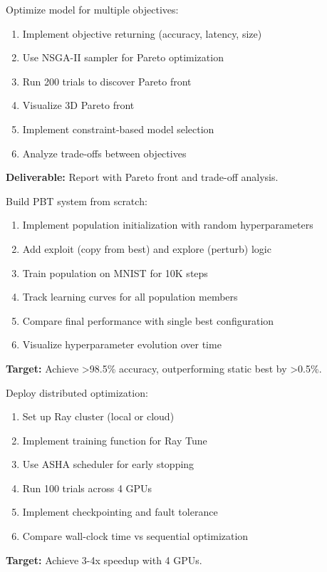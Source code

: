 \begin{exercise}
Optimize model for multiple objectives:
\begin{enumerate}
    \item Implement objective returning (accuracy, latency, size)
    \item Use NSGA-II sampler for Pareto optimization
    \item Run 200 trials to discover Pareto front
    \item Visualize 3D Pareto front
    \item Implement constraint-based model selection
    \item Analyze trade-offs between objectives
\end{enumerate}
\textbf{Deliverable:} Report with Pareto front and trade-off analysis.
\end{exercise}

\begin{exercise}
Build PBT system from scratch:
\begin{enumerate}
    \item Implement population initialization with random hyperparameters
    \item Add exploit (copy from best) and explore (perturb) logic
    \item Train population on MNIST for 10K steps
    \item Track learning curves for all population members
    \item Compare final performance with single best configuration
    \item Visualize hyperparameter evolution over time
\end{enumerate}
\textbf{Target:} Achieve >98.5\% accuracy, outperforming static best by >0.5\%.
\end{exercise}

\begin{exercise}
Deploy distributed optimization:
\begin{enumerate}
    \item Set up Ray cluster (local or cloud)
    \item Implement training function for Ray Tune
    \item Use ASHA scheduler for early stopping
    \item Run 100 trials across 4 GPUs
    \item Implement checkpointing and fault tolerance
    \item Compare wall-clock time vs sequential optimization
\end{enumerate}
\textbf{Target:} Achieve 3-4x speedup with 4 GPUs.
\end{exercise}

